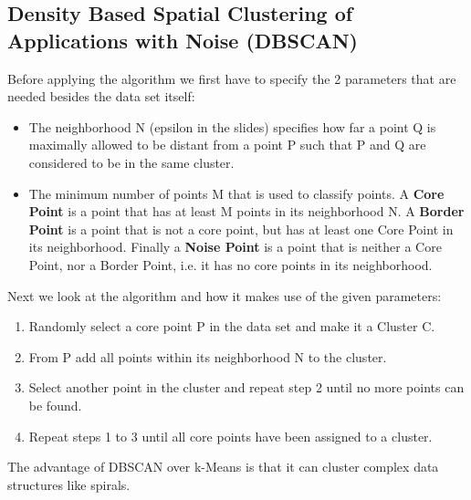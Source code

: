 \documentclass{article}
\begin{document}
\subsection{\textbf{D}ensity \textbf{B}ased \textbf{S}patial \textbf{C}lustering of \textbf{A}pplications with \textbf{N}oise (DBSCAN)}
Before applying the algorithm we first have to specify the 2 parameters that are needed besides the data set itself: 

\begin{itemize}
	\item The neighborhood N (epsilon in the slides) specifies how far a point Q is maximally allowed to be distant from a point P such that P and Q are considered to be in the same cluster. 
	
	\item The minimum number of points M that is used to classify points. A \textbf{Core Point} is a point that has at least M points in its neighborhood N. A \textbf{Border Point} is a point that is not a core point, but has at least one Core Point in its neighborhood. Finally a \textbf{Noise Point} is a point that is neither a Core Point, nor a Border Point, i.e. it has no core points in its neighborhood. 
\end{itemize}

Next we look at the algorithm and how it makes use of the given parameters: 
\begin{enumerate}
	\item Randomly select a core point P in the data set and make it a Cluster C. 
	
	\item From P add all points within its neighborhood N to the cluster. 
	
	\item Select another point in the cluster and repeat step 2 until no more points can be found. 
	
	\item Repeat steps 1 to 3 until all core points have been assigned to a cluster. 
\end{enumerate}

The advantage of DBSCAN over k-Means is that it can cluster complex data structures like spirals. 


\end{document}
